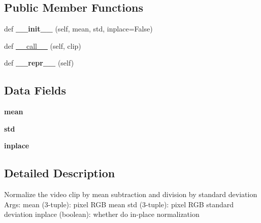 \subsection*{Public Member Functions}
\begin{DoxyCompactItemize}
\item 
\mbox{\label{classtorchvision_1_1transforms_1_1__transforms__video_1_1NormalizeVideo_a3e38867f0c56035f9973f1c2eb9bd928}} 
def {\bfseries \+\_\+\+\_\+init\+\_\+\+\_\+} (self, mean, std, inplace=False)
\item 
def \hyperlink{classtorchvision_1_1transforms_1_1__transforms__video_1_1NormalizeVideo_a054f98d66be0e760e208fdd6c3aaaecf}{\+\_\+\+\_\+call\+\_\+\+\_\+} (self, clip)
\item 
\mbox{\label{classtorchvision_1_1transforms_1_1__transforms__video_1_1NormalizeVideo_a34db9f67ec9476433c09c5efd4ff14cb}} 
def {\bfseries \+\_\+\+\_\+repr\+\_\+\+\_\+} (self)
\end{DoxyCompactItemize}
\subsection*{Data Fields}
\begin{DoxyCompactItemize}
\item 
\mbox{\label{classtorchvision_1_1transforms_1_1__transforms__video_1_1NormalizeVideo_a7e31d5855c4e6526b1819ceb11a150e3}} 
{\bfseries mean}
\item 
\mbox{\label{classtorchvision_1_1transforms_1_1__transforms__video_1_1NormalizeVideo_a5803785fe6436200b1fd216b53e6a4ce}} 
{\bfseries std}
\item 
\mbox{\label{classtorchvision_1_1transforms_1_1__transforms__video_1_1NormalizeVideo_ac64650dcde230a47f9f9c549104114ac}} 
{\bfseries inplace}
\end{DoxyCompactItemize}


\subsection{Detailed Description}
\begin{DoxyVerb}Normalize the video clip by mean subtraction and division by standard deviation
Args:
    mean (3-tuple): pixel RGB mean
    std (3-tuple): pixel RGB standard deviation
    inplace (boolean): whether do in-place normalization
\end{DoxyVerb}
 

